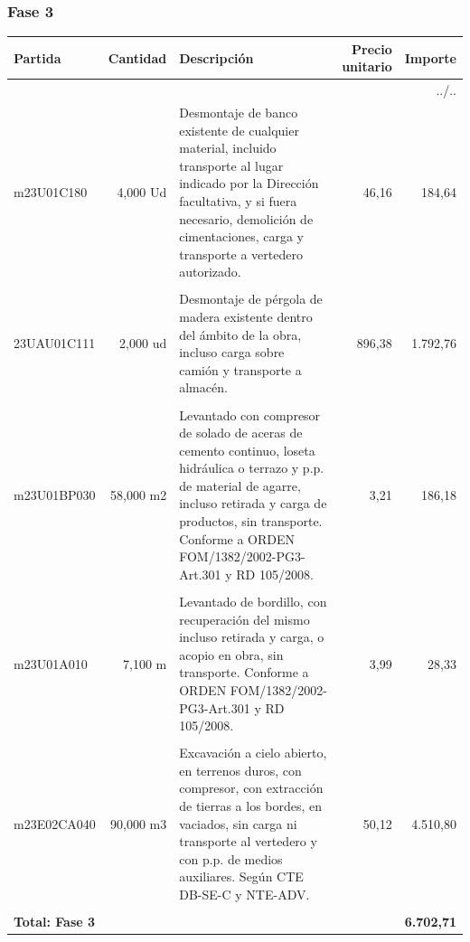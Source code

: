 \documentclass{book}%
\begin{document}
\subsubsection{Fase 3}%
\small%
\begin{longtable}{lrlrr}%
Partida&Cantidad&Descripción&\multicolumn{1}{p{1.5cm}}{Precio unitario}&Importe\\%
\hline%
\endhead%
\multicolumn{5}{r}{../..}\\%
\endfoot%
\hline%
\endlastfoot%
m23U01C180&     4,000 Ud&\multicolumn{1}{p{5cm}}{Desmontaje de banco existente de cualquier material, incluido transporte al lugar indicado por la Dirección facultativa, y si fuera necesario, demolición de cimentaciones, carga y transporte a vertedero autorizado.}&     46,16&184,64\\%
&&&&\\%
23UAU01C111&     2,000 ud&\multicolumn{1}{p{5cm}}{Desmontaje de pérgola de madera existente dentro del ámbito de la obra, incluso carga sobre camión y transporte a almacén.}&    896,38&1.792,76\\%
&&&&\\%
m23U01BP030&    58,000 m2&\multicolumn{1}{p{5cm}}{Levantado con compresor de solado de aceras de cemento continuo, loseta hidráulica o terrazo y p.p. de material de agarre, incluso retirada y carga de productos, sin transporte. Conforme a ORDEN FOM/1382/2002{-}PG3{-}Art.301 y RD 105/2008.}&      3,21&186,18\\%
&&&&\\%
m23U01A010&     7,100 m&\multicolumn{1}{p{5cm}}{Levantado de bordillo, con recuperación del mismo incluso retirada y carga, o acopio en obra, sin transporte. Conforme a ORDEN FOM/1382/2002{-}PG3{-}Art.301 y RD 105/2008.}&      3,99&28,33\\%
&&&&\\%
m23E02CA040&    90,000 m3&\multicolumn{1}{p{5cm}}{Excavación a cielo abierto, en terrenos duros, con compresor, con extracción de tierras a los bordes, en vaciados, sin carga ni transporte al vertedero y con p.p. de medios auxiliares. Según CTE DB{-}SE{-}C y NTE{-}ADV.}&     50,12&4.510,80\\%
&&&&\\%
\multicolumn{4}{p{8cm}}{\textbf{Total: Fase 3}}&\textbf{6.702,71}\\%
\end{longtable}%
\normalsize

%
\end{document}
